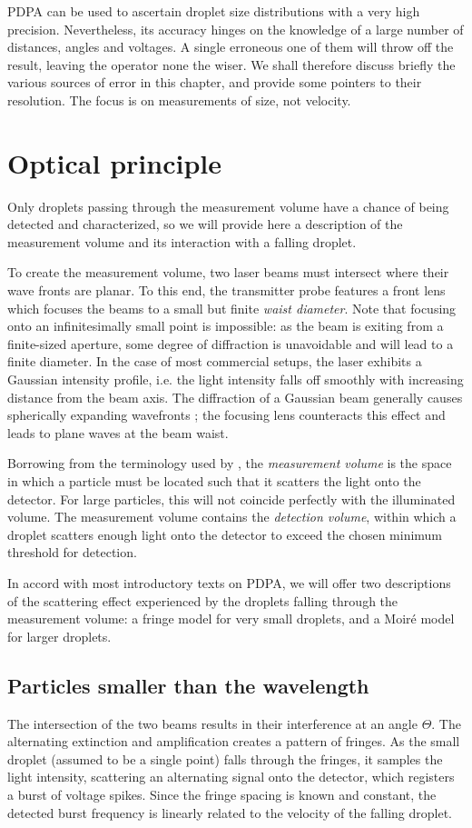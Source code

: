 \documentclass[11.5pt,oneside]{book}
\begin{document}
PDPA can be used to ascertain droplet size distributions with a very high
precision. Nevertheless, its accuracy hinges on the knowledge of a large number
of distances, angles and voltages. A single erroneous one of them will throw
off the result, leaving the operator none the wiser. We shall therefore discuss
briefly the various sources of error in this chapter, and provide some pointers
to their resolution. The focus is on measurements of size, not velocity.

\section{Optical principle}
Only droplets passing through the measurement volume have a chance of being
detected and characterized, so we will provide here a description of the 
measurement volume and its interaction with a falling droplet.

To create the measurement volume, two laser beams must intersect where their
wave fronts are planar. To this end, the transmitter probe features a front lens
which focuses the beams to a small but finite \emph{waist diameter}. Note that
focusing onto an infinitesimally small point is impossible: as the beam is
exiting from a finite-sized aperture, some degree of diffraction is unavoidable
and will lead to a finite diameter. In the case of most commercial setups, the
laser exhibits a Gaussian intensity profile, i.e. the light intensity falls off
smoothly with increasing distance from the beam axis. The diffraction of a
Gaussian beam generally causes spherically expanding wavefronts
\cite{Thyagarajan10}; the focusing lens counteracts this effect and leads to
plane waves at the beam waist.

Borrowing from the terminology used by \citet{Albrecht03}, the \emph{measurement
volume} is the space in which a particle must be located such that it scatters
the light onto the detector. For large particles, this will not coincide
perfectly with the illuminated volume. The measurement volume contains the
\emph{detection volume}, within which a droplet scatters enough light onto the
detector to exceed the chosen minimum threshold for detection.

In accord with most introductory texts on PDPA, we will offer two descriptions
of the scattering effect experienced by the droplets falling through the
measurement volume: a fringe model for very small droplets, and a Moiré model
for larger droplets.

\subsection{Particles smaller than the wavelength}
The intersection of the two beams results in their interference at an angle
$\Theta$. The alternating extinction and amplification creates a pattern of
fringes. As the small droplet (assumed to be a single point) falls through the
fringes, it samples the light intensity, scattering an alternating signal onto
the detector, which registers a burst of voltage spikes. Since the fringe
spacing is known and constant, the detected burst frequency is linearly related
to the velocity of the falling droplet.
\end{document}
